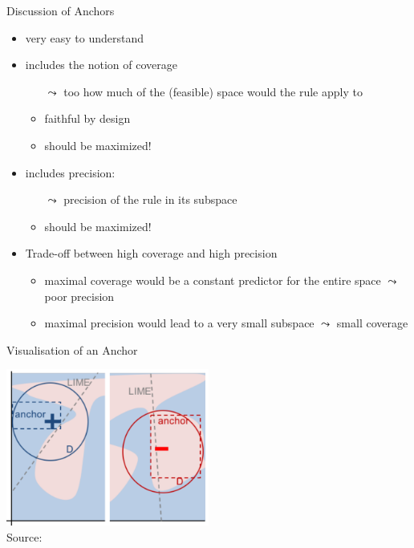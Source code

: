 \documentclass[aspectratio=169]{../latex_main/tntbeamer}  %
\begin{document}

\begin{frame}[c]{Discussion of Anchors}

\begin{itemize}
    \item very easy to understand
    \smallskip
    \pause
    \item includes the notion of coverage
    \begin{itemize}
        \item[$\leadsto$] too how much of the (feasible) space would the rule apply to
        \item faithful by design
        \item should be maximized!
    \end{itemize}
    \smallskip
    \pause
    \item includes precision:
    \begin{itemize}
        \item[$\leadsto$] precision of the rule in its subspace
        \item should be maximized!
    \end{itemize}
    \smallskip
    \pause
    \item Trade-off between high coverage and high precision
    \begin{itemize}
        \item maximal coverage would be a constant predictor for the entire space $\leadsto$ poor precision
        \item maximal precision would lead to a very small subspace $\leadsto$ small coverage
    \end{itemize}
    
\end{itemize}


\end{frame}


\begin{frame}[c]{Visualisation of an Anchor}

\centering
\includegraphics[width=0.5\textwidth]{./figure/anchors-visualization_orig.png}\\
Source: 

\end{frame}
\end{document}
